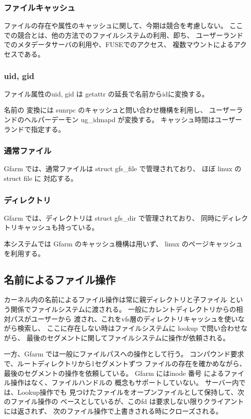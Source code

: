 \subsubsection{ファイルキャッシュ}
	ファイルの存在や属性のキャッシュに関して、今期は競合を考慮しない。
	ここでの競合とは、他の方法でのファイルシステムの利用、即ち、
	ユーザーランドでのメタデータサーバの利用や、FUSEでのアクセス、
	複数マウントによるアクセスである。

\subsubsection{uid, gid}
	ファイル属性のuid, gid は getattr の延長で名前からidに変換する。

	名前の 変換には sunrpc のキャッシュと問い合わせ機構を利用し、
	ユーザーランドのヘルパーデーモン ug_idmapd が変換する。
	キャッシュ時間はユーザーランドで指定する。

\subsubsection{通常ファイル}
	Gfarm では、通常ファイルは struct gfs_file で管理されており、
	ほぼ linux の struct file に 対応する。

\subsubsection{ディレクトリ}
	Gfarm では、ディレクトリは struct gfs_dir で管理されており、
	同時にディレクトリキャッシュも持っている。

	本システムでは Gfarm のキャッシュ機構は用いず、
	linux のページキャッシュを利用する。

\subsection{名前によるファイル操作}
	カーネル内の名前によるファイル操作は常に親ディレクトリと子ファイル
	という関係でファイルシステムに渡される。
	一般にカレントディレクトリからの相対パスがユーザーから
	渡され、これをvfs層のディレクトリキャッシュを使いながら検索し、
	ここに存在しない時はファイルシステムに lookup で問い合わせながら、
	最後のセグメントに関してファイルシステムに操作が依頼される。


	一方、Gfarm では一般にファイルパスへの操作として行う。
	コンパウンド要求で、ルートディレクトリから1セグメントずつ
	ファイルの存在を確かめながら、最後のセグメントの操作を依頼している。
	Gfarm にはinode 番号 によるファイル操作はなく、ファイルハンドルの
	概念もサポートしていない。
	サーバー内では、Lookup操作でも
	見つけたファイルをオープンファイルとして保持して、次のファイル操作の
	ベースとしているが、このfd は要求しない限りクライアントには返されず、
	次のファイル操作で上書きされる時にクローズされる。

